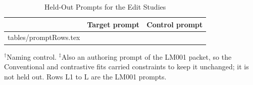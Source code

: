 \documentclass[conference,10pt,letterpaper]{IEEEtran}
\makeatletter
\renewcommand{\arraystretch}{1.2}
\newcommand{\tablerows}[1]{\@@input #1 }
\newcommand{\tablenote}[1]{\begin{tablenotes}[flushleft]\footnotesize\item[] #1\end{tablenotes}}
\makeatother
\begin{document}
\begin{table}[t]
\centering
\caption{Held-Out Prompts for the Edit Studies}
\label{tab:prompts}
\footnotesize
\renewcommand{\arraystretch}{1.05}
\begin{threeparttable}
\begin{tabular}{@{}rll@{}}
\toprule
 & Target prompt & Control prompt \\
\midrule
\tablerows{tables/promptRows.tex}
\bottomrule
\end{tabular}
\tablenote{$^\dagger$Naming control. $^\ddagger$Also an authoring prompt of the LM001 packet, so the Conventional and contrastive fits carried constraints to keep it unchanged; it is not held out. Rows L1 to L\lmTargets{} are the LM001 prompts.}
\end{threeparttable}
\end{table}


\makeatletter
\let\paperthebibliography\thebibliography
\renewcommand{\thebibliography}[1]{\paperthebibliography{#1}\interlinepenalty=10000\relax}
\makeatother

\end{document}
